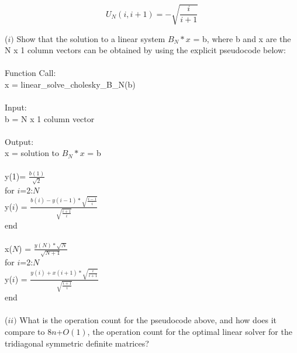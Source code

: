 \documentclass{article}
\DeclareMathOperator{\1}{\mathit{1}}
\numberwithin{figure}{section} %
\numberwithin{table}{section}
\begin{document}
\begin{equation}
	U_N(i,i+1) = -\sqrt{\frac{i}{i+1}}
\end{equation}

(\(i)\) Show that the solution to a linear system \(B_N*x\) = b, where b and x are the N x 1 column vectors can be obtained by using the explicit pseudocode below:\\\\
	\indent \hspace{5 cm} Function Call:\\
	\indent \hspace{5 cm} x = linear\_solve\_cholesky\_B\_N(b)\\\\
	\indent \hspace{5 cm} Input:\\
	\indent \hspace{5 cm} b = N x 1 column vector \\\\
	\indent \hspace{5 cm} Output:\\
	\indent \hspace{5 cm} x = solution to \(B_N*x\) = b\\\\
	\indent \hspace{5 cm} y(1)= \(\frac{b(1)}{\sqrt{2}}\) \\
	\indent \hspace{5 cm} for \(i\)=2:\(N\) \\
	\indent \hspace{5 cm} \indent y(\(i\)) = \(\frac{b(i)-y(i-1)*\sqrt{\frac{i-1}{i}}}{\sqrt{\frac{i+1}{i}}}\) \\
	\indent \hspace{5 cm} end \\\\
	\indent \hspace{5 cm} x(\(N\)) = \(\frac{y(N) * \sqrt{N}}{\sqrt{N+1}}\)\\
	\indent \hspace{5 cm} for \(i\)=2:\(N\) \\
	\indent \hspace{5 cm} \indent y(\(i\)) = \(\frac{y(i)+x(i+1)*\sqrt{\frac{i}{i+1}}}{\sqrt{\frac{i+1}{i}}}\) \\
	\indent \hspace{5 cm} end \\\\
	
(\(ii)\) What is the operation count for the pseudocode above, and how does it compare to \(8n\)+\(O(1)\), the operation count for the optimal linear solver for the tridiagonal symmetric definite matrices? \\\\
\end{document}
